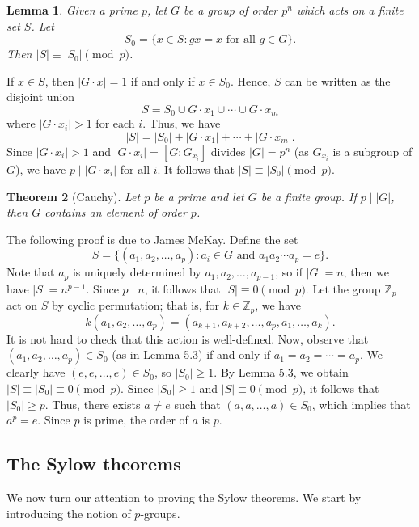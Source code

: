 \documentclass[10pt]{article}
\makeatletter
\newcommand{\Z}{\mathbb{Z}}
\theoremstyle{newstyle}
\newtheorem{thm}{Theorem}[section]
\newtheorem{lemma}[thm]{Lemma}
\newenvironment{pf}[1][\proofname]{\par
  \pushQED{\qed}%
  \normalfont \topsep0\p@\relax
  \trivlist
  \item[\hskip\labelsep\scshape
  #1\@addpunct{.}]\ignorespaces
}{%
  \popQED\endtrivlist\@endpefalse
}
\makeatother
\begin{document}
\begin{lemma}
Given a prime $p$, let $G$ be a group of order $p^n$ which acts on a finite set $S$. 
Let 
\[ S_0 = \{x \in S : gx = x \text{ for all } g \in G\}. \]
Then $|S| \equiv |S_0| \pmod p$. 
\end{lemma}
\begin{pf}
If $x \in S$, then $|G \cdot x| = 1$ if and only if $x \in S_0$. Hence, $S$ can be written 
as the disjoint union 
\[ S = S_0 \cup G \cdot x_1 \cup \cdots \cup G \cdot x_m \]
where $|G \cdot x_i| > 1$ for each $i$. Thus, we have 
\[ |S| = |S_0| + |G \cdot x_1| + \cdots + |G \cdot x_m|. \]
Since $|G \cdot x_i| > 1$ and $|G \cdot x_i| = [G : G_{x_i}]$ divides $|G| = p^n$ 
(as $G_{x_i}$ is a subgroup of $G$), we have $p \mid |G \cdot x_i|$ for all $i$. 
It follows that $|S| \equiv |S_0| \pmod p$. 
\end{pf}

\begin{thm}[Cauchy]
Let $p$ be a prime and let $G$ be a finite group. If $p \mid |G|$, then $G$ contains an element of 
order $p$. 
\end{thm}
\begin{pf}
The following proof is due to James McKay. Define the set 
\[ S = \{(a_1, a_2, \dots, a_p) : a_i \in G \text{ and } a_1a_2 \cdots a_p = e\}. \]
Note that $a_p$ is uniquely determined by $a_1, a_2, \dots, a_{p-1}$, so if $|G| = n$, then 
we have $|S| = n^{p-1}$. Since $p \mid n$, it follows that $|S| \equiv 0 \pmod p$. 
Let the group $\Z_p$ act on $S$ by cyclic permutation; that is, for $k \in \Z_p$, we have 
\[ k(a_1, a_2, \dots, a_p) = (a_{k+1}, a_{k+2}, \dots, a_p, a_1, \dots, a_k). \]
It is not hard to check that this action is well-defined. Now, observe that 
$(a_1, a_2, \dots, a_p) \in S_0$ (as in Lemma 5.3) if and only if $a_1 = a_2 = \cdots = a_p$. 
We clearly have $(e, e, \dots, e) \in S_0$, so $|S_0| \geq 1$. By Lemma 5.3, 
we obtain $|S| \equiv |S_0| \equiv 0 \pmod p$. Since $|S_0| \geq 1$ and $|S| \equiv 0 \pmod p$, 
it follows that $|S_0| \geq p$. Thus, there exists $a \neq e$ such that $(a, a, \dots, a) \in S_0$, 
which implies that $a^p = e$. Since $p$ is prime, the order of $a$ is $p$. 
\end{pf}

\subsection{The Sylow theorems}
We now turn our attention to proving the Sylow theorems. We start by introducing the notion of 
$p$-groups.
\end{document}
